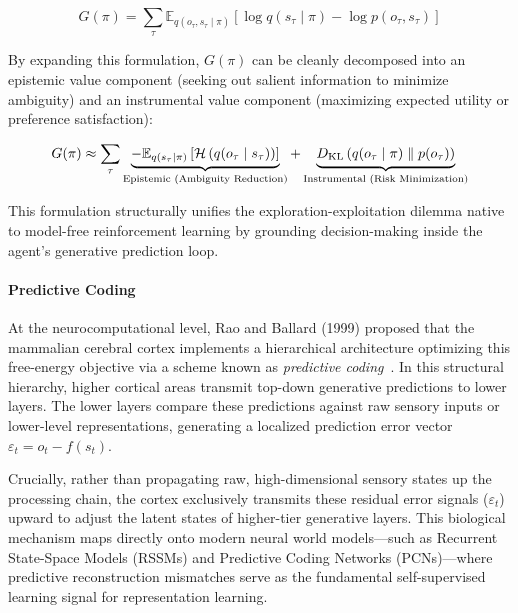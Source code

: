 \documentclass{tufte-handout}
\begin{document}
\begin{equation}
    G(\pi) = \sum_\tau \mathbb{E}_{q(o_\tau, s_\tau \mid \pi)}\left[\log q(s_\tau \mid \pi) - \log p(o_\tau, s_\tau)\right]
    \label{eq:active_base}
\end{equation}

By expanding this formulation, $G(\pi)$ can be cleanly decomposed into an epistemic value 
component (seeking out salient information to minimize ambiguity) and an instrumental value component (maximizing expected utility or 
preference satisfaction):

\begin{equation}
    G(\pi) \approx \sum_\tau \underbrace{-\mathbb{E}_{q(s_\tau \mid \pi)}\left[\mathcal{H}\left(q(o_\tau \mid s_\tau)\right)\right]}_{\text{Epistemic (Ambiguity Reduction)}} + \underbrace{\vphantom{\mathbb{E}_{q(s_\tau \mid \pi)}}D_{\mathrm{KL}}\left(q(o_\tau \mid \pi) \parallel p(o_\tau)\right)}_{\text{Instrumental (Risk Minimization)}}
    \label{eq:active_decomposition}
\end{equation}

This formulation structurally unifies the exploration-exploitation dilemma native to model-free reinforcement learning by 
grounding decision-making inside the agent's generative prediction loop.

\paragraph{Predictive Coding}
At the neurocomputational level, Rao and Ballard (1999) proposed that the mammalian cerebral cortex implements 
a hierarchical architecture optimizing this free-energy objective via a scheme known 
as \textit{predictive coding}~\nocite{rao1999}. 
In this structural hierarchy, higher cortical areas transmit top-down generative predictions to lower layers. The lower layers compare these predictions against raw sensory inputs or lower-level representations, generating a localized prediction error vector $\varepsilon_t = o_t - f(s_t)$. 

Crucially, rather than propagating raw, high-dimensional sensory 
states up the processing chain, the cortex exclusively transmits these residual error signals ($\varepsilon_t$) upward 
to adjust the latent states of higher-tier generative layers. This biological mechanism maps directly onto modern 
neural world models—such as Recurrent State-Space Models (RSSMs) and Predictive Coding Networks (PCNs)—where predictive 
reconstruction mismatches serve as the fundamental self-supervised learning signal for representation learning.
\end{document}

